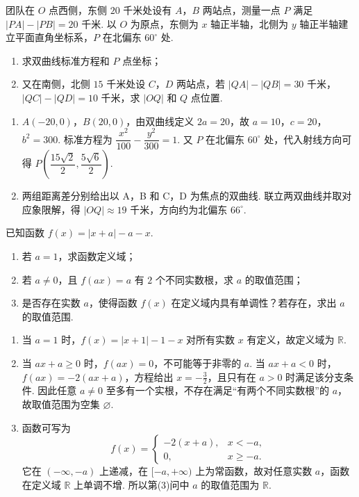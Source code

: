 \begin{problem}
团队在 \(O\) 点西侧，东侧 \(20\) 千米处设有 \(A\)，\(B\) 两站点，测量一点 \(P\) 满足 \(|PA|-|PB|=20\) 千米. 以 \(O\) 为原点，东侧为 \(x\) 轴正半轴，北侧为 \(y\) 轴正半轴建立平面直角坐标系，\(P\) 在北偏东 \(60^\circ\) 处.
\begin{enumerate}
\item 求双曲线标准方程和 \(P\) 点坐标；
\item 又在南侧，北侧 \(15\) 千米处设 \(C\)，\(D\) 两站点，若 \(|QA|-|QB|=30\) 千米，\(|QC|-|QD|=10\) 千米，求 \(|OQ|\) 和 \(Q\) 点位置.
\end{enumerate}
\end{problem}

\begin{solution}
\begin{enumerate}
\item \(A(-20,0)\)，\(B(20,0)\)，由双曲线定义 \(2a=20\)，故 \(a=10\)，\(c=20\)，\(b^2=300\). 标准方程为 \(\dfrac{x^2}{100}-\dfrac{y^2}{300}=1\). 又 \(P\) 在北偏东 \(60^\circ\) 处，代入射线方向可得 \(P\left(\dfrac{15\sqrt2}{2},\dfrac{5\sqrt6}{2}\right)\).
\item 两组距离差分别给出以 A，B 和 C，D 为焦点的双曲线. 联立两双曲线并取对应象限解，得 \(|OQ|\approx19\) 千米，方向约为北偏东 \(66^\circ\).
\end{enumerate}
\end{solution}

\begin{problem}
已知函数 \(f(x)=|x+a|-a-x\).
\begin{enumerate}
\item 若 \(a=1\)，求函数定义域；
\item 若 \(a\ne0\)，且 \(f(ax)=a\) 有 \(2\) 个不同实数根，求 \(a\) 的取值范围；
\item 是否存在实数 \(a\)，使得函数 \(f(x)\) 在定义域内具有单调性？若存在，求出 \(a\) 的取值范围.
\end{enumerate}
\end{problem}

\begin{solution}
\begin{enumerate}
\item 当 \(a=1\) 时，\(f(x)=|x+1|-1-x\) 对所有实数 \(x\) 有定义，故定义域为 \(\mathbb R\).
\item 当 \(ax+a\ge0\) 时，\(f(ax)=0\)，不可能等于非零的 \(a\). 当 \(ax+a<0\) 时，\(f(ax)=-2(ax+a)\)，方程给出 \(x=-\frac32\)，且只有在 \(a>0\) 时满足该分支条件. 因此任意 \(a\ne0\) 至多有一个实根，不存在满足“有两个不同实数根”的 \(a\)，故取值范围为空集 \(\varnothing\).
\item 函数可写为
\[
f(x)=\begin{cases}-2(x+a),&x<-a,\\0,&x\ge-a.\end{cases}
\]
它在 \((-\infty,-a)\) 上递减，在 \([-a,+\infty)\) 上为常函数，故对任意实数 \(a\)，函数在定义域 \(\mathbb R\) 上单调不增. 所以第(3)问中 \(a\) 的取值范围为 \(\mathbb R\).
\end{enumerate}
\end{solution}

